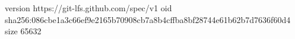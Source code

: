 version https://git-lfs.github.com/spec/v1
oid sha256:086cbe1a3c66ef9e2165b70908cb7a8b4cffba8bf28744e61b62b7d7636f60d4
size 65632

